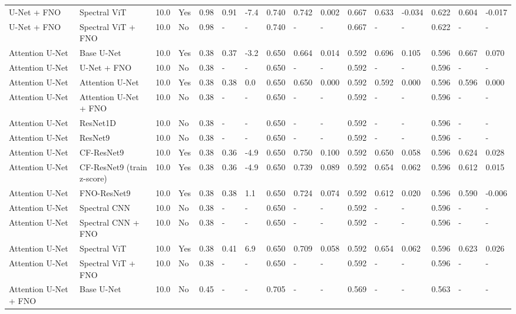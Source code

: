 \begin{longtable}{llllllllllllllll}
U-Net + FNO & Spectral ViT & 10.0 & Yes & 0.98 & 0.91 & -7.4 & 0.740 & 0.742 & 0.002 & 0.667 & 0.633 & -0.034 & 0.622 & 0.604 & -0.017 \\
U-Net + FNO & Spectral ViT + FNO & 10.0 & No & 0.98 & - & - & 0.740 & - & - & 0.667 & - & - & 0.622 & - & - \\
Attention U-Net & Base U-Net & 10.0 & Yes & 0.38 & 0.37 & -3.2 & 0.650 & 0.664 & 0.014 & 0.592 & 0.696 & 0.105 & 0.596 & 0.667 & 0.070 \\
Attention U-Net & U-Net + FNO & 10.0 & No & 0.38 & - & - & 0.650 & - & - & 0.592 & - & - & 0.596 & - & - \\
Attention U-Net & Attention U-Net & 10.0 & Yes & 0.38 & 0.38 & 0.0 & 0.650 & 0.650 & 0.000 & 0.592 & 0.592 & 0.000 & 0.596 & 0.596 & 0.000 \\
Attention U-Net & Attention U-Net + FNO & 10.0 & No & 0.38 & - & - & 0.650 & - & - & 0.592 & - & - & 0.596 & - & - \\
Attention U-Net & ResNet1D & 10.0 & No & 0.38 & - & - & 0.650 & - & - & 0.592 & - & - & 0.596 & - & - \\
Attention U-Net & ResNet9 & 10.0 & No & 0.38 & - & - & 0.650 & - & - & 0.592 & - & - & 0.596 & - & - \\
Attention U-Net & CF-ResNet9 & 10.0 & Yes & 0.38 & 0.36 & -4.9 & 0.650 & 0.750 & 0.100 & 0.592 & 0.650 & 0.058 & 0.596 & 0.624 & 0.028 \\
Attention U-Net & CF-ResNet9 (train z-score) & 10.0 & Yes & 0.38 & 0.36 & -4.9 & 0.650 & 0.739 & 0.089 & 0.592 & 0.654 & 0.062 & 0.596 & 0.612 & 0.015 \\
Attention U-Net & FNO-ResNet9 & 10.0 & Yes & 0.38 & 0.38 & 1.1 & 0.650 & 0.724 & 0.074 & 0.592 & 0.612 & 0.020 & 0.596 & 0.590 & -0.006 \\
Attention U-Net & Spectral CNN & 10.0 & No & 0.38 & - & - & 0.650 & - & - & 0.592 & - & - & 0.596 & - & - \\
Attention U-Net & Spectral CNN + FNO & 10.0 & No & 0.38 & - & - & 0.650 & - & - & 0.592 & - & - & 0.596 & - & - \\
Attention U-Net & Spectral ViT & 10.0 & Yes & 0.38 & 0.41 & 6.9 & 0.650 & 0.709 & 0.058 & 0.592 & 0.654 & 0.062 & 0.596 & 0.623 & 0.026 \\
Attention U-Net & Spectral ViT + FNO & 10.0 & No & 0.38 & - & - & 0.650 & - & - & 0.592 & - & - & 0.596 & - & - \\
Attention U-Net + FNO & Base U-Net & 10.0 & No & 0.45 & - & - & 0.705 & - & - & 0.569 & - & - & 0.563 & - & - \\

\end{longtable}
